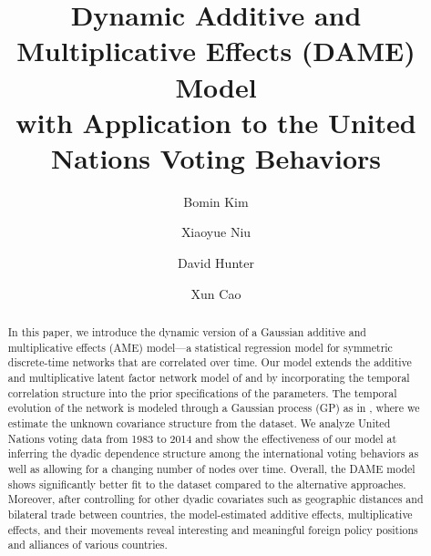 \documentclass[a4paper]{article}
\title{Dynamic Additive and Multiplicative Effects (DAME) Model\\
	with Application to the United Nations Voting Behaviors}
\author[1]{Bomin Kim}
\author[1]{Xiaoyue Niu}
\author[1]{David Hunter}
\author[2]{Xun Cao}
\affil[1]{Department of Statistics, The Pennsylvania State University}
\affil[2]{Department of Political Science, The Pennsylvania State University}
\date{}
\begin{document}
	\maketitle
	\begin{abstract}
		\noindent  
		In this paper, we introduce the dynamic version of a Gaussian additive and multiplicative effects (AME) model---a statistical regression model for symmetric discrete-time networks that are correlated over time. Our model extends the additive and multiplicative latent factor network model of \cite{hoff2009multiplicative} and \cite{minhas2016inferential} by incorporating the temporal correlation structure into the prior specifications of the parameters. The temporal evolution of the network is modeled through a Gaussian process (GP) as in \cite{durante2013nonparametric}, where we estimate the unknown covariance structure from the dataset. We analyze United Nations voting data from 1983 to 2014 \citep{12379_2016} and show the effectiveness of our model at inferring the dyadic dependence structure among the international voting behaviors as well as allowing for a changing number of nodes over time. Overall, the DAME model shows significantly better fit to the dataset compared to the alternative approaches. Moreover, after controlling for other dyadic covariates such as geographic distances and bilateral trade between countries, the model-estimated additive effects, multiplicative effects, and their movements reveal interesting and meaningful foreign policy positions and alliances of various countries. 
	\end{abstract}
\end{document}
